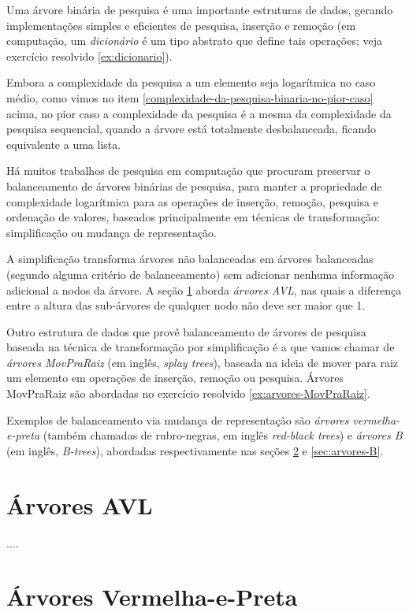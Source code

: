 Uma árvore binária de pesquisa é uma importante estruturas de dados,
gerando implementações simples e eficientes de pesquisa, inserção e
remoção (em computação, um {\em dicionário\/} é um tipo abstrato que
define tais operações; veja exercício resolvido \ref{ex:dicionario}).

Embora a complexidade da pesquisa a um elemento seja logarítmica no
caso médio, como vimos no item
\ref{complexidade-da-pesquisa-binaria-no-pior-caso} acima, no pior
caso a complexidade da pesquisa é a mesma da complexidade da pesquisa
sequencial, quando a árvore está totalmente desbalanceada, ficando
equivalente a uma lista.

Há muitos trabalhos de pesquisa em computação que procuram preservar o
balanceamento de árvores binárias de pesquisa, para manter a
propriedade de complexidade logarítmica para as operações de inserção,
remoção, pesquisa e ordenação de valores, baseados principalmente em
técnicas de transformação: simplificação ou mudança de representação.

A simplificação transforma árvores não balanceadas em árvores
balanceadas (segundo alguma critério de balanceamento) sem adicionar
nenhuma informação adicional a nodos da árvore. A seção
\ref{sec:arvores-AVL} aborda {\em árvores AVL\/}, nas quais a
diferença entre a altura das sub-árvores de qualquer nodo não deve ser
maior que 1.

Outro estrutura de dados que provê balanceamento de árvores de
pesquisa baseada na técnica de transformação por simplificação é a que
vamos chamar de {\em árvores MovPraRaiz\/} (em inglês, {\em splay
  trees\/}), baseada na ideia de mover para raiz um elemento em
operações de inserção, remoção ou pesquisa.  Árvores MovPraRaiz são
abordadas no exercício resolvido \ref{ex:arvores-MovPraRaiz}.

Exemplos de balanceamento via mudança de representação são {\em
  árvores vermelha-e-preta\/} (também chamadas de rubro-negras, em
inglês {\em red-black trees\/}) e {\em árvores B\/} (em inglês, {\em
  B-trees\/}), abordadas respectivamente nas seções
\ref{sec:arvore-vermelha-e-preta} e \ref{sec:arvores-B}.

\section{Árvores AVL}
\label{sec:arvores-AVL}

....

\section{Árvores Vermelha-e-Preta}
\label{sec:arvore-vermelha-e-preta}

